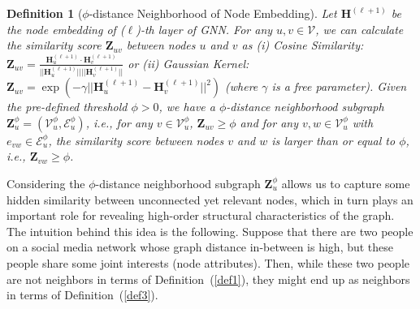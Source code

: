 \documentclass[letterpaper]{article} %
\newtheorem{definition}{Definition} %
\begin{document}
\begin{definition}[{\footnotesize $\phi$-distance Neighborhood of Node Embedding}]
\label{k_hop_neighbors_node_embedding}
\label{def3}
Let $\boldsymbol{H}^{(\ell+1)}$ be the node embedding of ($\ell$)-th layer of GNN. For any $u, v \in \mathcal{V}$, we can calculate the similarity score $\boldsymbol{Z}_{uv}$ between nodes $u$ and $v$ as (i) Cosine Similarity: $\boldsymbol{Z}_{uv} = \frac{\boldsymbol{H}_u^{(\ell+1)} \cdot \boldsymbol{H}_v^{(\ell+1)}}{||\boldsymbol{H}_u^{(\ell+1)}|| ||\boldsymbol{H}_v^{(\ell+1)}||}$ or (ii) Gaussian Kernel: $\boldsymbol{Z}_{uv} = \exp{(-\gamma||\boldsymbol{H}_u^{(\ell+1)} - \boldsymbol{H}_v^{(\ell+1)}||^2)}$ (where $\gamma$ is a free parameter). Given the pre-defined threshold $\phi > 0$, we have a $\phi$-distance neighborhood subgraph $\boldsymbol{Z}^\phi_u = (\mathcal{{V}}^\phi_u, \mathcal{{E}}^\phi_u)$, i.e., for any $v \in \mathcal{{V}}^\phi_u$, $\boldsymbol{Z}_{uv} \geq \phi$ and for any $v, w \in \mathcal{{V}}^\phi_u$ with $e_{vw} \in \mathcal{{E}}^\phi_u$, the similarity score between nodes $v$ and $w$ is larger than or equal to $\phi$, i.e., $\boldsymbol{Z}_{vw} \geq \phi$.
\end{definition}
Considering the $\phi$-distance neighborhood subgraph $\boldsymbol{Z}^\phi_{u}$ allows us to capture some hidden similarity between  unconnected yet relevant nodes, which in turn plays an important role for revealing high-order structural characteristics of the graph.
The intuition behind this idea is the following. Suppose that there are two people on a social media network whose graph distance in-between is high, but these people share some joint interests (node attributes). Then, while these two people are not neighbors in terms of Definition~(\ref{def1}), they might end up as neighbors in terms of Definition~(\ref{def3}).
\end{document}
